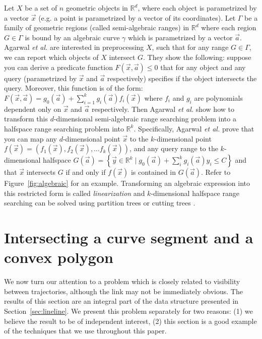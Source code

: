\documentclass[a4paper, UKenglish]{paper}
\newcommand{\etal}{\textit{et al.}\xspace}
\begin{document}
Let $X$ be a set of $n$ geometric objects in $\mathbb{R}^d$, where each object is parametrized by a vector $\vec{x}$ (e.g. a point is parametrized by a vector of its coordinates). Let $\Gamma$ be a family of geometric regions (called semi-algebraic ranges) in $\mathbb{R}^d$ where each region $G \in \Gamma$ is bound by an algebraic curve $\gamma$ which is parametrized by a vector $\vec{a}$. Agarwal \etal \cite{agarwal2013range} are interested in preprocessing $X$, such that for any range $G \in \Gamma$, we can report which objects of $X$ intersect $G$. They show the following: suppose you can derive a predicate function $F(\vec{x}, \vec{a}) \le 0$ that for any object and any query (parametrized by $\vec{x}$ and $\vec{a}$ respectively) specifies if the object intersects the query.  Moreover, this function is of the form: $F(\vec{x}, \vec{a}) =  g_0(\vec{a}) + \sum_{i=1}^k g_i(\vec{a})f_i(\vec{x})$ where $f_i$ and $g_i$ are polynomials dependent only on $\vec{x}$ and $\vec{a}$ respectively. Then Agarwal \etal show how to transform this $d$-dimensional semi-algebraic range searching problem into a halfspace range searching problem into $\mathbb{R}^k$. Specifically, Agarwal \etal prove that you can map any $d$-dimensional point $\vec{x}$ to the $k$-dimensional point $f(\vec{x}) = (f_1(\vec{x}), f_2(\vec{x}), \dots f_k(\vec{x}))$, and any query range to the $k$-dimensional halfspace $G(\vec{a}) = \left\{ \vec{y} \in \mathbb{R}^k \mid g_0(\vec{a})  + \sum_i^k g_i(\vec{a})y_i  \le C \right\}$ and that $\vec{x}$ intersects $G$ if and only if $f(\vec{x})$ is contained in $G(\vec{a})$. Refer to Figure~\ref{fig:algebraic} for an example. Transforming an algebraic expression into this restricted form is called \emph{linearization} and $k$-dimensional halfspace range searching can be solved using partition trees \cite{chan2012optimal} or cutting trees \cite{chazelle1993cutting}.



\section{Intersecting a curve segment and a convex polygon}
\label{sec:intersectionsearch}

We now turn our attention to a problem which is closely related to visibility between trajectories, although the link may not be immediately obvious. The results of this section are an integral part of the data structure presented in Section~\ref{sec:lineline}. We present this problem separately for two reasons: (1) we believe the result to be of independent interest, (2) this section is a good example of the techniques that we use throughout this paper. 
\end{document}
